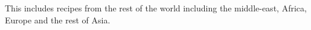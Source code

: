 This includes recipes from the rest of the world including the middle-east,
Africa, Europe and the rest of Asia.
\clearpage


